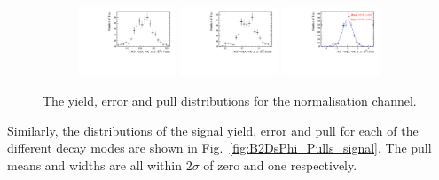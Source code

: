 \begin{figure}[!h]
\begin{subfigure}[t]{1.0\textwidth}
      \caption{\decay{\Dsp}{\pip\pim\pip}}
   \end{subfigure}\\
   \begin{subfigure}[t]{1.0\textwidth}
      \includegraphics[width=0.32\textwidth]{figs/B2DsPhi/Plots_DsKK_Value_yield_peak_DsD0_Ds2KPiPi_toy_both_DsBDTbin1_PhiBDTbin1_both_both.pdf}
      \includegraphics[width=0.32\textwidth]{figs/B2DsPhi/Plots_DsKK_Error_yield_peak_DsD0_Ds2KPiPi_toy_both_DsBDTbin1_PhiBDTbin1_both_both.pdf}
      \includegraphics[width=0.32\textwidth]{figs/B2DsPhi/Plots_DsKK_Pull_yield_peak_DsD0_Ds2KPiPi_toy_both_DsBDTbin1_PhiBDTbin1_both_both.pdf}
      \caption{\decay{\Dsp}{\Kp\pim\pip}}
   \end{subfigure}

   \caption{The yield, error and pull distributions for the normalisation channel.}
   \label{fig:B2DsPhi_Pulls_normalisation}
\end{figure}


Similarly, the distributions of the signal yield, error and pull for each of the different \Dsp decay modes are shown in Fig.~\ref{fig:B2DsPhi_Pulls_signal}. The pull means and widths are all within $2\sigma$ of zero and one respectively.



